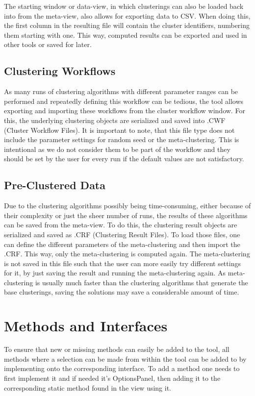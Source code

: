 \documentclass[
	a4paper,
	english,
	twoside,
	openright,               
	11pt                            
	]{report}
\begin{document}
The starting window or data-view, in which clusterings can also be loaded back into from the meta-view, also allows for exporting data to CSV. When doing this, the first column in the resulting file will contain the cluster identifiers, numbering them starting with one. This way, computed results can be exported and used in other tools or saved for later.

\subsection{Clustering Workflows}
As many runs of clustering algorithms with different parameter ranges can be performed and repeatedly defining this workflow can be tedious, the tool allows exporting and importing these workflows from the cluster workflow window. For this, the underlying clustering objects are serialized and saved into .CWF (Cluster Workflow Files). It is important to note, that this file type does not include the parameter settings for random seed or the meta-clustering. This is intentional as we do not consider them to be part of the workflow and they should be set by the user for every run if the default values are not satisfactory.

\subsection{Pre-Clustered Data}
Due to the clustering algorithms possibly being time-consuming, either because of their complexity or just the sheer number of runs, the results of these algorithms can be saved from the meta-view. To do this, the clustering result objects are serialized and saved as .CRF (Clustering Result Files). To load those files, one can define the different parameters of the meta-clustering and then import the .CRF. This way, only the meta-clustering is computed again. The meta-clustering is not saved in this file such that the user can more easily try different settings for it, by just saving the result and running the meta-clustering again. As meta-clustering is usually much faster than the clustering algorithms that generate the base clusterings, saving the solutions may save a considerable amount of time.

\section{Methods and Interfaces}
To ensure that new or missing methods can easily be added to the tool, all methods where a selection can be made from within the tool can be added to by implementing onto the corresponding interface. To add a method one needs to first implement it and if needed it's OptionsPanel, then adding it to the corresponding static method found in the view using it.
\end{document}

